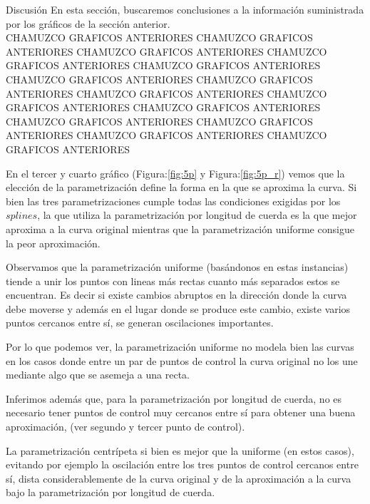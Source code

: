 \begin{section}{Discusión}
	En esta sección, buscaremos conclusiones a la información suministrada por los gráficos de la sección anterior.\\
	
	CHAMUZCO GRAFICOS ANTERIORES	CHAMUZCO GRAFICOS ANTERIORES	CHAMUZCO GRAFICOS ANTERIORES	CHAMUZCO GRAFICOS ANTERIORES	CHAMUZCO GRAFICOS ANTERIORES	CHAMUZCO GRAFICOS ANTERIORES	CHAMUZCO GRAFICOS ANTERIORES	CHAMUZCO GRAFICOS ANTERIORES	CHAMUZCO GRAFICOS ANTERIORES	CHAMUZCO GRAFICOS ANTERIORES	CHAMUZCO GRAFICOS ANTERIORES	CHAMUZCO GRAFICOS ANTERIORES	CHAMUZCO GRAFICOS ANTERIORES	CHAMUZCO GRAFICOS ANTERIORES
	
	En el tercer y cuarto gráfico (Figura:\ref{fig:5p} y Figura:\ref{fig:5p_r}) vemos que la elección de la parametrización define la forma en la que se aproxima la curva. Si bien las tres parametrizaciones cumple todas las condiciones exigidas por los $splines$, la que utiliza la parametrización por longitud de cuerda es la que mejor aproxima a la curva original mientras que la parametrización uniforme consigue la peor aproximación.
	
	Observamos que la parametrización uniforme (basándonos en estas instancias) tiende a unir los puntos con lineas más rectas cuanto más separados estos se encuentran. Es decir si existe cambios abruptos en la dirección donde la curva debe moverse y además en el lugar donde se produce este cambio, existe varios puntos cercanos entre sí, se generan oscilaciones importantes.  
	
	
	Por lo que podemos ver, la parametrización uniforme no modela bien las curvas en los casos donde entre un par de puntos de control la curva original no los une mediante algo que se asemeja a una recta.
	
	Inferimos además que, para la parametrización por longitud de cuerda, no es necesario tener puntos de control muy cercanos entre sí para obtener una buena aproximación, (ver segundo y tercer punto de control).
	
	La parametrización centrípeta si bien es mejor que la uniforme (en estos casos), evitando por ejemplo la oscilación entre los tres puntos de control cercanos entre sí, dista considerablemente de la curva original y de la aproximación a la curva bajo la parametrización por longitud de cuerda.\\
	

\end{section}
